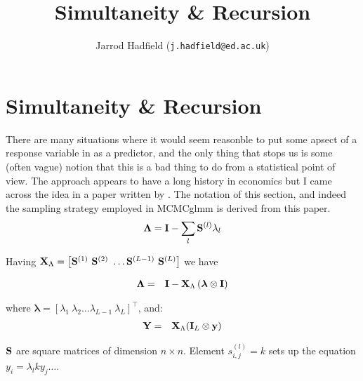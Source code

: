 \documentclass{article}
\title{Simultaneity \& Recursion}
\author{Jarrod Hadfield (\texttt{j.hadfield@ed.ac.uk})}
\begin{document}
\maketitle
\else
\chapter{Simultaneity \& Recursion}
\label{SandR}
\fi


There are many situations where it would seem reasonble to put some apsect of a response variable in as a predictor, and the only thing that stops us is some (often vague) notion that this is a bad thing to do from a statistical point of view. The approach appears to have a long history in economics but I came across the idea in a paper written by  \citet{Gianola.2004}. The notation of this section, and indeed the sampling strategy employed in MCMCglmm is derived from this paper.\\



\begin{equation}
{\bm \Lambda} = {\bf I} - \sum_{l}{\bf S}^{(l)}{\lambda_{l}}
\end{equation}

Having ${\bf X}_{\Lambda} = \left[{\bf S}^{(1)}\ {\bf S}^{(2)}\ \dots {\bf S}^{(L-1)}\ {\bf S}^{(L)}\right]$ we have 

\begin{equation}
\begin{array}{rl}
{\bm \Lambda} =& {\bf I}-{\bf X}_{\Lambda}\left({\bm \lambda} \otimes {\bf I} \right)\\
\end{array}
\label{rs-Eq}
\end{equation}

where ${\bm \lambda} = \left[\lambda_{1}\ \lambda_{2} \dots \lambda_{L-1}\ \lambda_{L} \right]^{\top}$, and:\\

\begin{equation}
\begin{array}{rl}
{\bf Y} =&  {\bf X}_{\Lambda}({\bf I}_{L} \otimes {\bf y})\\
\end{array}
\end{equation}


${\bf S}$ are square matrices of dimension $n \times n$. Element $s_{i,j}^{(l)}=k$ sets up the equation $y_{i} = \lambda_{l}ky_{j} \dots$.\\
\end{document}
